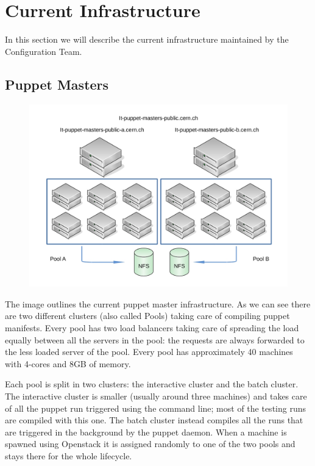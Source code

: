 \section{Current Infrastructure}

In this section we will describe the current infrastructure maintained by
the Configuration Team.

\subsection{Puppet Masters}


\begin{figure}[H]
\includegraphics[width=\textwidth,height=\textheight,keepaspectratio]{ConfigurationManagement/Infrastructure_pm.jpg}
\end{figure}

The image outlines the current puppet master infrastructure. As we can see
there are two different clusters (also called Pools) taking care of
compiling puppet manifests. Every pool has two load balancers taking care
of spreading the load equally between all the servers in the pool: the
requests are always forwarded to the less loaded server of the pool. Every
pool has approximately 40 machines with 4-cores and 8GB of memory.

Each pool is split in two clusters: the interactive cluster and the batch
cluster. The interactive cluster is smaller (usually around three
machines) and takes care of all the puppet run triggered using the command
line; most of the testing runs are compiled with this one. The batch
cluster instead compiles all the runs that are triggered in the background
by the puppet daemon. When a machine is spawned using Openstack it is
assigned randomly to one of the two pools and stays there for the whole
lifecycle.

